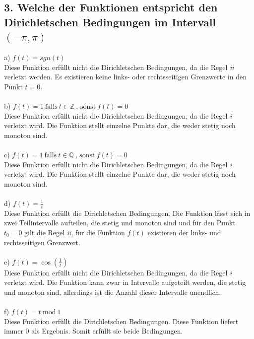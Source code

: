 \subsection*{3. Welche der Funktionen entspricht den Dirichletschen Bedingungen im Intervall $(-\pi,\pi)$}
a) $f(t) = sgn(t)$\\
Diese Funktion erf\"ullt nicht die Dirichletschen Bedingungen, da die Regel \textit{ii} verletzt werden. Es existieren keine links- oder rechtsseitigen Grenzwerte in den Punkt $t = 0$.\\\\
b) $f(t) = 1~\text{falls}~t \in \mathds{Z}~\text{, sonst}~f(t) = 0$\\
Diese Funktion erf\"ullt nicht die Dirichletschen Bedingungen, da die Regel \textit{i} verletzt wird. Die Funktion stellt einzelne Punkte dar, die weder stetig noch monoton sind.\\\\
c) $f(t) = 1~\text{falls}~t \in \mathds{Q}~\text{, sonst}~f(t) = 0$\\
Diese Funktion erf\"ullt nicht die Dirichletschen Bedingungen, da die Regel \textit{i} verletzt wird. Die Funktion stellt einzelne Punkte dar, die weder stetig noch monoton sind.\\\\
d) $f(t) = \frac{1}{t}$\\
Diese Funktion erf\"ullt die Dirichletschen Bedingungen. Die Funktion l\"asst sich in zwei Teilintervalle aufteilen, die stetig und monoton sind und f\"ur den Punkt $t_0 = 0$ gilt die Regel \textit{ii}, f\"ur die Funktion $f(t)$ existieren der links- und rechtsseitigen Grenzwert.\\\\
e) $f(t) = \cos(\frac{1}{t})$\\
Diese Funktion erf\"ullt nicht die Dirichletschen Bedingungen, da die Regel \textit{i} verletzt wird. Die Funktion kann zwar in Intervalle aufgeteilt werden, die stetig und monoton sind, allerdings ist die Anzahl dieser Intervalle unendlich.\\\\ 
f) $f(t) = t~\text{mod}~1$\\
Diese Funktion erf\"ullt die Dirichletschen Bedingungen. Diese Funktion liefert immer $0$ als Ergebnis. Somit erf\"ullt sie beide Bedingungen.
